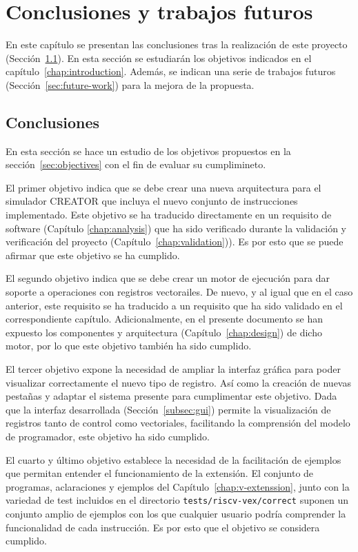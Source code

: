 \chapter{Conclusiones y trabajos futuros}\label{chap:conclusions}
En este capítulo se presentan las conclusiones tras la realización de este proyecto (Sección~\ref{sec:conclussions}). En esta sección se estudiarán los objetivos indicados en el capítulo~\ref{chap:introduction}. Además, se indican una serie de trabajos futuros (Sección~\ref{sec:future-work}) para la mejora de la propuesta.

\section{Conclusiones}\label{sec:conclussions}
En esta sección se hace un estudio de los objetivos propuestos en la sección~\ref{sec:objectives} con el fin de evaluar su cumplimineto.

El primer objetivo indica que se debe crear una nueva arquitectura para el simulador CREATOR que incluya el nuevo conjunto de instrucciones implementado. Este objetivo se ha traducido directamente en un requisito de software (Capítulo \ref{chap:analysis}) que ha sido verificado durante la validación y verificación del proyecto (Capítulo~\ref{chap:validation})). Es por esto que se puede afirmar que este objetivo se ha cumplido.

El segundo objetivo indica que se debe crear un motor de ejecución para dar soporte a operaciones con registros vectorailes. De nuevo, y al igual que en el caso anterior, este requisito se ha traducido a un requisito que ha sido validado en el correspondiente capítulo. Adicionalmente, en el presente documento se han expuesto los componentes y arquitectura (Capítulo~\ref{chap:design}) de dicho motor, por lo que este objetivo también ha sido cumplido.

El tercer objetivo expone la necesidad de ampliar la interfaz gráfica para poder visualizar correctamente el nuevo tipo de registro. Así como la creación de nuevas pestañas y adaptar el sistema presente para cumplimentar este objetivo. Dada que la interfaz desarrollada (Sección~\ref{subsec:gui}) permite la visualización de registros tanto de control como vectoriales, facilitando la comprensión del modelo de programador, este objetivo ha sido cumplido.

El cuarto y último objetivo establece la necesidad de la facilitación de ejemplos que permitan entender el funcionamiento de la extensión. El conjunto de programas, aclaraciones y ejemplos del Capítulo~\ref{chap:v-extenssion}, junto con la variedad de test incluidos en el directorio \texttt{tests/riscv-vex/correct} suponen un conjunto amplio de ejemplos con los que cualquier usuario podría comprender la funcionalidad de cada instrucción. Es por esto que el objetivo se considera cumplido.

